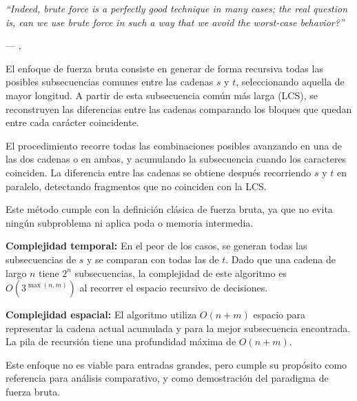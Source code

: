 \epigraph{\textit{``Indeed, brute force is a perfectly good technique in many cases; the real question is, can we use brute force in such a way that we avoid the worst-case behavior?''}}{--- \citeauthor{taocv3}, \citeyear{taocv3} \cite{taocv3}}

El enfoque de fuerza bruta consiste en generar de forma recursiva todas las posibles subsecuencias comunes entre las cadenas $s$ y $t$, seleccionando aquella de mayor longitud. A partir de esta subsecuencia común más larga (LCS), se reconstruyen las diferencias entre las cadenas comparando los bloques que quedan entre cada carácter coincidente.

El procedimiento recorre todas las combinaciones posibles avanzando en una de las dos cadenas o en ambas, y acumulando la subsecuencia cuando los caracteres coinciden. La diferencia entre las cadenas se obtiene después recorriendo $s$ y $t$ en paralelo, detectando fragmentos que no coinciden con la LCS.

Este método cumple con la definición clásica de fuerza bruta, ya que no evita ningún subproblema ni aplica poda o memoria intermedia.

\begin{algorithm}[H]

    \footnotesize
    \DontPrintSemicolon



    \caption{Generación de LCS por fuerza bruta y reconstrucción de diferencias}
    \label{alg:brute_force_lcs}
\end{algorithm}

\textbf{Complejidad temporal:} En el peor de los casos, se generan todas las subsecuencias de $s$ y se comparan con todas las de $t$. Dado que una cadena de largo $n$ tiene $2^n$ subsecuencias, la complejidad de este algoritmo es $O(3^{\max(n,m)})$ al recorrer el espacio recursivo de decisiones.

\textbf{Complejidad espacial:} El algoritmo utiliza $O(n + m)$ espacio para representar la cadena actual acumulada y para la mejor subsecuencia encontrada. La pila de recursión tiene una profundidad máxima de $O(n + m)$.

Este enfoque no es viable para entradas grandes, pero cumple su propósito como referencia para análisis comparativo, y como demostración del paradigma de fuerza bruta.
